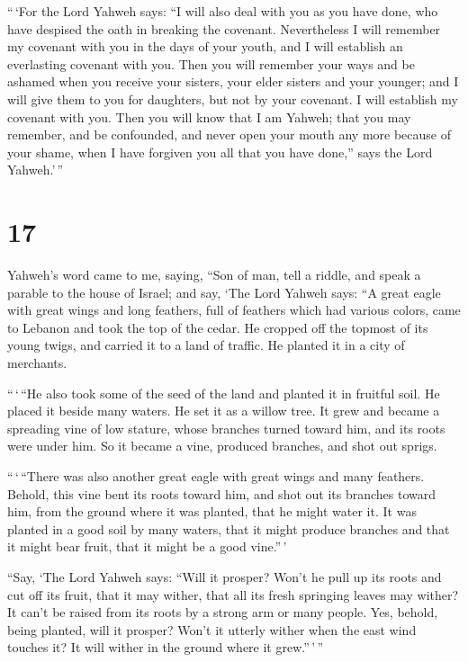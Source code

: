  ``\,`For the Lord Yahweh says: ``I will also deal with
you as you have done, who have despised the oath in breaking the
covenant.  Nevertheless I will remember my covenant with
you in the days of your youth, and I will establish an everlasting
covenant with you.  Then you will remember your ways and
be ashamed when you receive your sisters, your elder sisters and your
younger; and I will give them to you for daughters, but not by your
covenant.  I will establish my covenant with you. Then
you will know that I am Yahweh;  that you may remember,
and be confounded, and never open your mouth any more because of your
shame, when I have forgiven you all that you have done,'' says the Lord
Yahweh.'\,''

\hypertarget{section-16}{%
\section{17}\label{section-16}}

 Yahweh's word came to me, saying,  ``Son of
man, tell a riddle, and speak a parable to the house of Israel;
 and say, `The Lord Yahweh says: ``A great eagle with
great wings and long feathers, full of feathers which had various
colors, came to Lebanon and took the top of the cedar.  He
cropped off the topmost of its young twigs, and carried it to a land of
traffic. He planted it in a city of merchants.

 ``\,`\,``He also took some of the seed of the land and
planted it in fruitful soil. He placed it beside many waters. He set it
as a willow tree.  It grew and became a spreading vine of
low stature, whose branches turned toward him, and its roots were under
him. So it became a vine, produced branches, and shot out sprigs.

 ``\,`\,``There was also another great eagle with great
wings and many feathers. Behold, this vine bent its roots toward him,
and shot out its branches toward him, from the ground where it was
planted, that he might water it.  It was planted in a good
soil by many waters, that it might produce branches and that it might
bear fruit, that it might be a good vine.''\,'

 ``Say, `The Lord Yahweh says: ``Will it prosper? Won't he
pull up its roots and cut off its fruit, that it may wither, that all
its fresh springing leaves may wither? It can't be raised from its roots
by a strong arm or many people.  Yes, behold, being
planted, will it prosper? Won't it utterly wither when the east wind
touches it? It will wither in the ground where it grew.''\,'\,''


